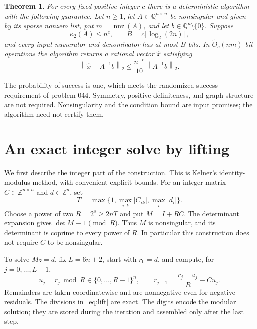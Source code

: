 \documentclass[11pt]{article}
\newtheorem{theorem}{Theorem}
\newcommand{\norm}[1]{\left\lVert#1\right\rVert}
\newcommand{\nnz}{\operatorname{nnz}}
\newcommand{\softO}{\widetilde O}
\begin{document}
\begin{theorem}\label{thm:main}
For every fixed positive integer $c$ there is a deterministic algorithm with
the following guarantee. Let $n\geq1$, let $A\in\mathbb Q^{n\times n}$ be
nonsingular and given by its sparse nonzero list, put $m=\nnz(A)$, and let
$b\in\mathbb Q^n\setminus\{0\}$. Suppose
\[
 \kappa_2(A)\leq n^c,
 \qquad B=c\lceil\log_2(2n)\rceil,
\]
and every input numerator and denominator has at most $B$ bits. In
$\softO_c(nm)$ bit operations the algorithm returns a rational vector
$\widehat x$ satisfying
\begin{equation}\label{eq:target}
 \norm{\widehat x-A^{-1}b}_2
 \leq \frac{n^{-c}}{10}\norm{A^{-1}b}_2.
\end{equation}
\end{theorem}
The probability of success is one, which meets the randomized success
requirement of problem 044. Symmetry, positive definiteness, and graph
structure are not required. Nonsingularity and the condition bound are input
promises; the algorithm need not certify them.

\section{An exact integer solve by lifting}
We first describe the integer part of the construction. This is Kelner's
identity-modulus method, with convenient explicit bounds. For an integer
matrix $C\in\mathbb Z^{n\times n}$ and $d\in\mathbb Z^n$, set
\[
 T=\max\{1,\max_{i,k}|C_{ik}|,\max_i|d_i|\}.
\]
Choose a power of two $R=2^s\geq2nT$ and put $M=I+RC$. The determinant
expansion gives $\det M\equiv1\pmod R$. Thus $M$ is nonsingular, and its
determinant is coprime to every power of $R$. In particular this construction
does not require $C$ to be nonsingular.

To solve $Mz=d$, fix $L=6n+2$, start with $r_0=d$, and compute, for
$j=0,\ldots,L-1$,
\begin{equation}\label{eq:lift}
 u_j=r_j\bmod R\in\{0,\ldots,R-1\}^n,
 \qquad
 r_{j+1}=\frac{r_j-u_j}{R}-Cu_j.
\end{equation}
Remainders are taken coordinatewise and are nonnegative even for negative
residuals. The divisions in~\eqref{eq:lift} are exact. The digits encode the
modular solution; they are stored during the iteration and assembled only
after the last step.
\end{document}
